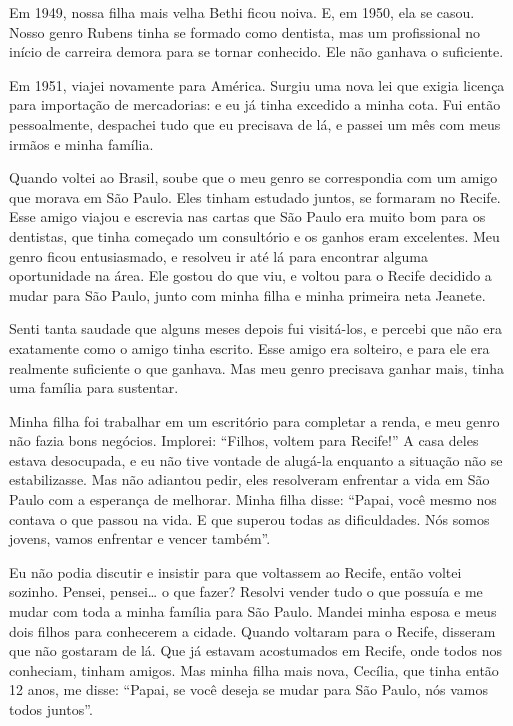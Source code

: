 Em 1949, nossa filha mais velha Bethi ficou noiva. E, em 1950, ela se
casou. Nosso genro Rubens tinha se formado como dentista, mas um
profissional no início de carreira demora para se tornar conhecido. Ele não ganhava o suficiente.

Em 1951, viajei novamente para América. Surgiu uma
nova lei que exigia licença para importação de mercadorias: e eu já tinha excedido a minha cota. Fui então pessoalmente, despachei tudo que eu precisava de lá, e passei um mês com meus irmãos e minha família.

Quando voltei ao Brasil, soube que o meu genro se correspondia 
com um amigo que morava em São Paulo. Eles tinham estudado
juntos, se formaram no Recife. Esse amigo viajou e escrevia nas cartas
que São Paulo era muito bom para os dentistas, que tinha começado um
consultório e os ganhos eram excelentes. Meu genro ficou
entusiasmado, e resolveu ir até lá para encontrar alguma oportunidade na área. Ele gostou do que viu, e voltou para o Recife decidido a mudar para São Paulo, junto com minha filha e
minha primeira neta Jeanete.

Senti tanta saudade que alguns meses depois fui visitá-los, e
percebi que não era exatamente como o amigo tinha escrito. Esse amigo era solteiro, e para ele era realmente suficiente o que ganhava. Mas meu genro precisava ganhar mais, tinha uma família para sustentar.

Minha filha foi trabalhar em um escritório para completar a renda, e 
meu genro não fazia bons negócios. Implorei: ``Filhos, voltem para
Recife!'' A casa deles estava desocupada, e eu não tive vontade de
alugá-la enquanto a situação não se estabilizasse. Mas não adiantou pedir, eles resolveram enfrentar a vida em São
Paulo com a esperança de melhorar. Minha filha disse:
``Papai, você mesmo nos contava o que passou na vida. E que superou
todas as dificuldades. Nós somos jovens, vamos enfrentar e
vencer também''.

Eu não podia discutir e insistir para que voltassem ao Recife, então 
voltei sozinho. Pensei, pensei\ldots{} o que fazer? Resolvi vender tudo o que
possuía e me mudar com toda a minha família para São Paulo. Mandei minha
esposa e meus dois filhos para conhecerem a cidade. Quando 
voltaram para o Recife, disseram que não gostaram de lá. 
Que já estavam acostumados em Recife, onde todos nos conheciam,
tinham amigos. Mas minha filha mais nova, Cecília, que tinha então 12
anos, me disse: ``Papai, se você deseja se mudar para São Paulo, nós
vamos todos juntos''.

